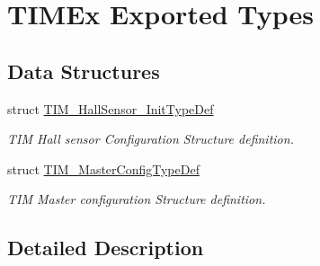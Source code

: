 \hypertarget{group___t_i_m_ex___exported___types}{}\section{T\+I\+M\+Ex Exported Types}
\label{group___t_i_m_ex___exported___types}
\subsection*{Data Structures}
\begin{DoxyCompactItemize}
\item 
struct \hyperlink{struct_t_i_m___hall_sensor___init_type_def}{T\+I\+M\+\_\+\+Hall\+Sensor\+\_\+\+Init\+Type\+Def}
\begin{DoxyCompactList}\small\item\em T\+IM Hall sensor Configuration Structure definition. \end{DoxyCompactList}\item 
struct \hyperlink{struct_t_i_m___master_config_type_def}{T\+I\+M\+\_\+\+Master\+Config\+Type\+Def}
\begin{DoxyCompactList}\small\item\em T\+IM Master configuration Structure definition. \end{DoxyCompactList}\end{DoxyCompactItemize}


\subsection{Detailed Description}
